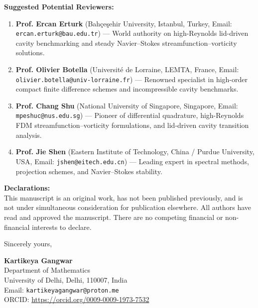 \documentclass[11pt]{article}
\begin{document}
\vspace{0.8em}
\noindent\textbf{Suggested Potential Reviewers:}
\begin{enumerate}
    \item \textbf{Prof. Ercan Erturk} (Bah\c{c}e\c{s}ehir University, Istanbul, Turkey, Email: \texttt{ercan.erturk@bau.edu.tr}) --- World authority on high-Reynolds lid-driven cavity benchmarking and steady Navier--Stokes streamfunction--vorticity solutions.
    \item \textbf{Prof. Olivier Botella} (Universit\'e de Lorraine, LEMTA, France, Email: \texttt{olivier.botella@univ-lorraine.fr}) --- Renowned specialist in high-order compact finite difference schemes and incompressible cavity benchmarks.
    \item \textbf{Prof. Chang Shu} (National University of Singapore, Singapore, Email: \texttt{mpeshuc@nus.edu.sg}) --- Pioneer of differential quadrature, high-Reynolds FDM streamfunction--vorticity formulations, and lid-driven cavity transition analysis.
    \item \textbf{Prof. Jie Shen} (Eastern Institute of Technology, China / Purdue University, USA, Email: \texttt{jshen@eitech.edu.cn}) --- Leading expert in spectral methods, projection schemes, and Navier--Stokes stability.
\end{enumerate}

\vspace{0.8em}
\noindent\textbf{Declarations:} \\
This manuscript is an original work, has not been published previously, and is not under simultaneous consideration for publication elsewhere. All authors have read and approved the manuscript. There are no competing financial or non-financial interests to declare.

\vspace{1.2em}
\noindent Sincerely yours,

\vspace{1.5em}
\noindent\textbf{Kartikeya Gangwar} \\
Department of Mathematics \\
University of Delhi, Delhi, 110007, India \\
Email: \texttt{kartikeyagangwar@proton.me} \\
ORCID: \url{https://orcid.org/0009-0009-1973-7532}
\end{document}
